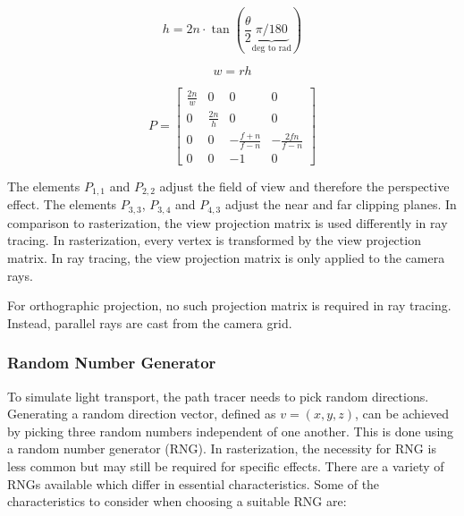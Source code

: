 \begin{equation}
  \label{eqn:perspectiveProjectionHeight}
  h = 2n \cdot \tan(\frac{\theta}{2} \underbrace{\pi / 180}_{\text{deg to rad}})
\end{equation}

\begin{equation}
  \label{eqn:perspectiveProjectionWidth}
  w = rh
\end{equation}

\begin{equation}
  \label{eqn:perspectiveProjectionMatrix}
  P =
  \begin{bmatrix}
    \frac{2n}{w} & 0            & 0                    & 0                  \\
    0            & \frac{2n}{h} & 0                    & 0                  \\
    0            & 0            & -\frac{f + n}{f - n} & -\frac{2fn}{f - n} \\
    0            & 0            & -1                   & 0
  \end{bmatrix}
\end{equation}

The elements $P_{1,1}$ and $P_{2,2}$ adjust the field of view and therefore the perspective effect. The elements $P_{3,3}$, $P_{3,4}$ and $P_{4,3}$ adjust the near and far clipping planes. In comparison to rasterization, the view projection matrix is used differently in ray tracing. In rasterization, every vertex is transformed by the view projection matrix. In ray tracing, the view projection matrix is only applied to the camera rays.

For orthographic projection, no such projection matrix is required in ray tracing. Instead, parallel rays are cast from the camera grid.

\subsubsection{Random Number Generator}

To simulate light transport, the path tracer needs to pick random directions. Generating a random direction vector, defined as $v = (x, y, z)$, can be achieved by picking three random numbers independent of one another. This is done using a random number generator (\gls{RNG}). In rasterization, the necessity for \gls{RNG} is less common but may still be required for specific effects. There are a variety of \glspl{RNG} available which differ in essential characteristics. Some of the characteristics to consider when choosing a suitable \gls{RNG} are:

